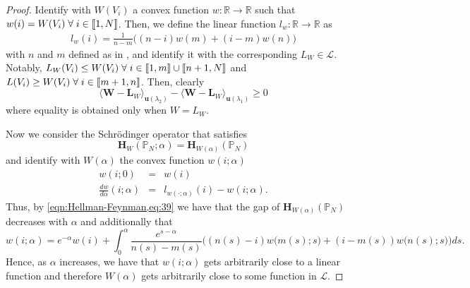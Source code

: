   \begin{proof}
  	 Identify with $W(V_i)$ a convex function $w: \mathbb{R} \rightarrow \mathbb{R}$ such that $w(i)=W(V_i) \; \forall \; i \in \left \llbracket 1 , N \right \rrbracket$. Then, we define the linear function $l_w: \mathbb{R} \rightarrow \mathbb{R}$ as
  	\begin{eqnarray}
  		l_w(i) = \frac{1}{n-m}\bigg((n-i)w(m) + (i-m)w(n)\bigg)
  	\end{eqnarray}
  	with $n$ and $m$ defined as in , and identify it with the corresponding $L_W \in \mathcal{L}$. Notably, $L_W(V_i) \leq W(V_i) \; \forall \; i \in \left \llbracket 1 , m \right \rrbracket\cup\left \llbracket n+1 , N \right \rrbracket$ and $L(V_i) \geq W(V_i) \; \forall \; i \in \left \llbracket m+1 , n \right \rrbracket$. Then, clearly
	\begin{equation}
	  \langle\mathbf{W}-\mathbf{L}_W\rangle_{\mathbf{u}(\lambda_2)} - \langle\mathbf{W}-\mathbf{L}_W\rangle_{\mathbf{u}(\lambda_1)} \geq 0 \label{eq:39}
	\end{equation}
	where equality is obtained only when $W=L_W$.

	Now we consider the Schr\"{o}dinger operator that satisfies
	\begin{equation}
		\mathbf{H}_{W}(\mathbb{P}_N;\alpha) = \mathbf{H}_{W(\alpha)}(\mathbb{P}_N)
	\end{equation}
	and identify with $W(\alpha)$ the convex function $w(i;\alpha)$
	\begin{eqnarray}
		w(i;0) &=& w(i) \\
		\frac{d{w}}{d \alpha}(i;\alpha) &=& l_{w(\cdot;\alpha)}(i) - w(i;\alpha).
	\end{eqnarray}
	Thus, by \cref{eqn:Hellman-Feynman,eq:39} we have that the gap of $\mathbf{H}_{W(\alpha)}(\mathbb{P}_N)$ decreases with $\alpha$ and additionally that
	\begin{equation}\label{eqn:converge}
		w(i;\alpha) = e^{-\alpha}w(i) + \int_0^\alpha \frac{e^{s-\alpha}}{n(s)-m(s)}\bigg((n(s)-i)w\big(m(s);s\big) + (i-m(s))w\big(n(s);s\big)\bigg)ds.
	\end{equation}
	Hence, as $\alpha$ increases, we have that $w(i;\alpha)$ gets arbitrarily close to a linear function and therefore $W(\alpha)$ gets arbitrarily close to some function in $\mathcal{L}$.
  \end{proof}

